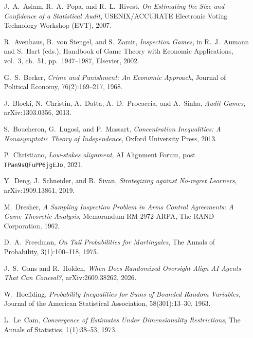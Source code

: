 
J.~A.~Aslam, R.~A.~Popa, and R.~L.~Rivest,
\emph{On Estimating the Size and Confidence of a Statistical Audit},
USENIX/ACCURATE Electronic Voting Technology Workshop (EVT), 2007.

R.~Avenhaus, B.~von Stengel, and S.~Zamir,
\emph{Inspection Games},
in R.~J.~Aumann and S.~Hart (eds.), Handbook of Game Theory with Economic Applications, vol.~3, ch.~51, pp.~1947--1987, Elsevier, 2002.

G.~S.~Becker,
\emph{Crime and Punishment: An Economic Approach},
Journal of Political Economy, 76(2):169--217, 1968.

J.~Blocki, N.~Christin, A.~Datta, A.~D.~Procaccia, and A.~Sinha,
\emph{Audit Games},
arXiv:1303.0356, 2013.

S.~Boucheron, G.~Lugosi, and P.~Massart,
\emph{Concentration Inequalities: A Nonasymptotic Theory of Independence},
Oxford University Press, 2013.

P.~Christiano,
\emph{Low-stakes alignment},
AI Alignment Forum, post \texttt{TPan9sQFuPP6jgEJo}, 2021.

Y.~Deng, J.~Schneider, and B.~Sivan,
\emph{Strategizing against No-regret Learners},
arXiv:1909.13861, 2019.

M.~Dresher,
\emph{A Sampling Inspection Problem in Arms Control Agreements: A Game-Theoretic Analysis},
Memorandum RM-2972-ARPA, The RAND Corporation, 1962.

D.~A.~Freedman,
\emph{On Tail Probabilities for Martingales},
The Annals of Probability, 3(1):100--118, 1975.

J.~S.~Gans and R.~Holden,
\emph{When Does Randomized Oversight Align AI Agents That Can Conceal?},
arXiv:2609.38262, 2026.

W.~Hoeffding,
\emph{Probability Inequalities for Sums of Bounded Random Variables},
Journal of the American Statistical Association, 58(301):13--30, 1963.

L.~Le~Cam,
\emph{Convergence of Estimates Under Dimensionality Restrictions},
The Annals of Statistics, 1(1):38--53, 1973.

